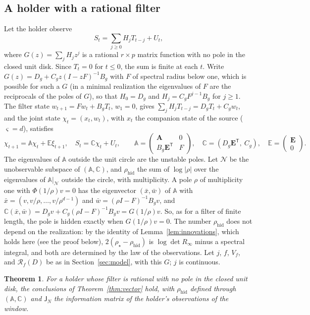 \documentclass[11pt,onecolumn]{IEEEtran}
\newtheorem{theorem}{Theorem}
\newcommand{\bA}{\mathbf A}
\newcommand{\bE}{\mathbf E}
\newcommand{\rhid}{\rho_{\mathrm{hid}}}
\begin{document}
\subsection{A holder with a rational filter}
\label{sec:iir}

Let the holder observe
\[
S_t=\sum_{j\ge0}H_jT_{t-j}+U_t ,
\]
where $G(z)=\sum_jH_jz^j$ is a rational $r\times p$ matrix function with no
pole in the closed unit disk. Since $T_t=0$ for $t\le0$, the sum is
finite at each $t$. Write $G(z)=D_g+C_gz(I-zF)^{-1}B_g$ with $F$ of
spectral radius below one, which is possible for such a $G$ (in a
minimal realization the eigenvalues of $F$ are the reciprocals of the
poles of $G$), so that $H_0=D_g$ and $H_j=C_gF^{j-1}B_g$ for $j\ge1$. The
filter state $w_{t+1}=Fw_t+B_gT_t$, $w_1=0$, gives
$\sum_jH_jT_{t-j}=D_gT_t+C_gw_t$, and the joint state $\chi_t=(x_t,w_t)$,
with $x_t$ the companion state of the source ($\varsigma=d$), satisfies
\[
\chi_{t+1}=\mathbb A\chi_t+\mathbb E\xi_{t+1},\quad
S_t=\mathbb C\chi_t+U_t,\qquad
\mathbb A=\begin{pmatrix}\bA&0\\B_g\bE^{\mathsf T}&F\end{pmatrix},\quad
\mathbb C=(D_g\bE^{\mathsf T},\ C_g),\quad
\mathbb E=\begin{pmatrix}\bE\\0\end{pmatrix}.
\]
The eigenvalues of $\mathbb A$ outside the unit circle are the unstable
poles. Let
$\mathcal N$ be the unobservable subspace of $(\mathbb A,\mathbb C)$, and
$\rhid$ the sum of $\log|\rho|$ over the eigenvalues of
$\mathbb A|_{\mathcal N}$ outside the circle, with multiplicity. A pole
$\rho$ of multiplicity one with $\Phi(1/\rho)v=0$ has the eigenvector
$(\bar x,\bar w)$ of $\mathbb A$ with $\bar x=(v,v/\rho,\dots,v/\rho^{d-1})$
and $\bar w=(\rho I-F)^{-1}B_gv$, and
$\mathbb C(\bar x,\bar w)=D_gv+C_g(\rho I-F)^{-1}B_gv=G(1/\rho)v$. So, as for
a filter of finite length, the pole is hidden exactly when
$G(1/\rho)v=0$. The number $\rhid$ does not depend on the realization: by
the identity of Lemma~\ref{lem:innovations}, which holds here (see the
proof below), $2(\rho_\star-\rhid)$ is $\log\det R_\infty$ minus a
spectral integral, and both are determined by the law of the
observations. Let $j$, $f$, $V_f$, and $\mathcal R_f(D)$ be as in
Section~\ref{sec:model}, with this $G$; $j$ is continuous.

\begin{theorem}\label{thm:iir}
For a holder whose filter is rational with no pole in the closed unit
disk, the conclusions of Theorem~\ref{thm:vector} hold, with $\rhid$
defined through $(\mathbb A,\mathbb C)$ and $\mathsf J_N$ the information
matrix of the holder's observations of the window.
\end{theorem}
\end{document}
